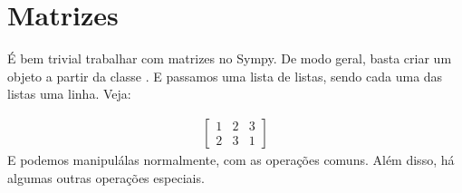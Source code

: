 \documentclass[letterpaper,10pt,english]{jupyterBook}
\begin{document}
\section{Matrizes}
\label{\detokenize{chapters/3:matrizes}}
\sphinxAtStartPar
É bem trivial trabalhar com matrizes no Sympy. De modo geral, basta criar um objeto a partir da classe . E passamos uma lista de listas, sendo cada uma das listas uma linha. Veja:

\begin{sphinxVerbatim}[commandchars=\\\{\}]
\PYG{p}{[}\PYG{p}{[}\PYG{p}{]}\PYG{p}{[}\PYG{p}{]}\PYG{p}{]}
\end{sphinxVerbatim}
\begin{equation*}
\begin{split}\displaystyle \left[\begin{matrix}1 & 2 & 3\\2 & 3 & 1\end{matrix}\right]\end{split}
\end{equation*}
\sphinxAtStartPar
E podemos manipulá\sphinxhyphen{}las normalmente, com as operações comuns. Além disso, há algumas outras operações especiais.
\end{document}
